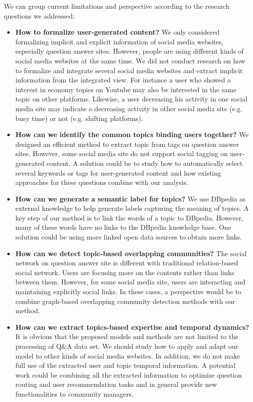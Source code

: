 We can group current limitations and perspective according to the research questions we addressed:
\begin{itemize}
\item{\textbf{How to formalize user-generated content?}
We only considered formalizing implicit and explicit information of social media websites, especially question answer sites. However, people are using different kinds of social media websites at the same time. We did not conduct research on how to formalize and integrate several social media websites and extract implicit information from the integrated view. For instance a user who showed a interest in economy topics on Youtube may also be interested in the same topic on other platforms. Likewise, a user decreasing his activity in one social media site may indicate a decreasing activity in other social media site (e.g. busy time) or not (e.g. shifting platforms).}

\item{\textbf{How can we identify the common topics binding users together?} We designed an efficient method to extract topic from tags on question answer sites. However, some social media site do not support social tagging on user-generated content. A solution could be to study how to automatically select several keywords or tags for user-generated content and how existing approaches for these questions combine with our analysis.}

\item{\textbf{How can we generate a semantic label for topics?} We use DBpedia as external knowledge to help generate labels capturing the meaning of topics. A key step of our method is to link the words of a topic to DBpedia. However, many of these words have no links to the DBpedia knowledge base. One solution could be using more linked open data sources to obtain more links.}

\item{\textbf{How can we detect topic-based overlapping communities?} The social network on question answer site is different with traditional relation-based social network. Users are focusing more on the contents rather than links between them. However, for some social media site, users are interacting and maintaining explicitly social links. In these cases, a perspective would be to combine graph-based overlapping community detection methods with our method.}

\item{\textbf{How can we extract topics-based expertise and temporal dynamics?} It is obvious that the proposed models and methods are not limited to the processing of Q\&A data set. We should study how to apply and adapt our model to other kinds of social media websites. In addition, we do not make full use of the extracted user and topic temporal information. A potential work could be combining all the extracted information to optimize question routing and user recommendation tasks and in general provide new functionalities to community managers.}

\end{itemize}



